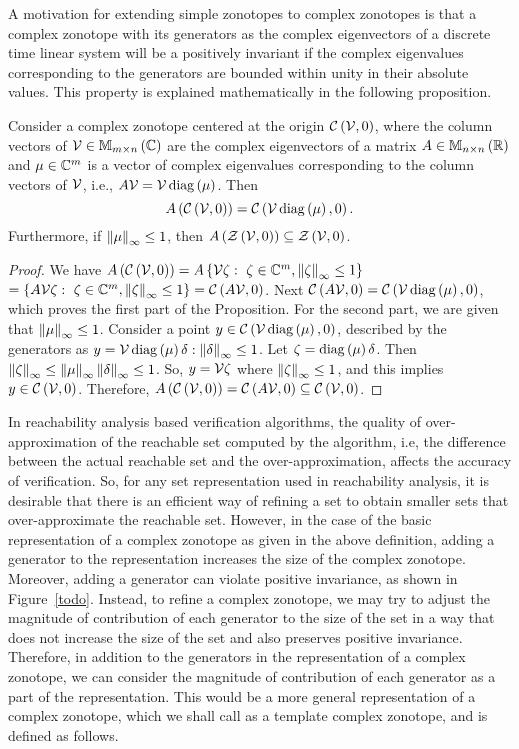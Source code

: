A motivation for extending simple zonotopes to complex zonotopes is
that a complex zonotope with its generators as the complex
eigenvectors of a discrete time linear system will be a positively
invariant if the complex eigenvalues corresponding to the generators
are bounded within unity in their absolute values.  This property is
explained mathematically in the following proposition.
%
\begin{proposition}
Consider a complex zonotope centered at the origin
$\mathit{\mathcal{C}}\left(\mathcal{V},0\right)$, where the column vectors of
$\mathcal{V}\in\mathbb{M}_{m\times n}\left(\mathbb{C}\right)$ are the complex eigenvectors of a
matrix $A\in\mathbb{M}_{n\times n}\left(\mathbb{R}\right)$ and $\mu\in\mathbb{C}^m$ is a vector of complex
eigenvalues corresponding to the column vectors of $\mathcal{V}$, i.e., $A\mathcal{V}
= \mathcal{V}\operatorname{diag}\left(\mu\right)$.
Then \[A\left(\mathit{\mathcal{C}}\left(\mathcal{V},0\right)\right)
= \mathit{\mathcal{C}}\left(\mathcal{V}\operatorname{diag}\left(\mu\right),0\right).\] Furthermore, if $\left\|\mu\right\|_{\infty}\leq
1$, then $A\left(\mathit{\mathcal{Z}}\left(\mathcal{V},0\right)\right)\subseteq \mathit{\mathcal{Z}}\left(\mathcal{V},0\right)$.
\end{proposition}
% 
\begin{proof}
We have $A\left(\mathit{\mathcal{C}}\left(\mathcal{V},0\right)\right) =
A\left\{\mathcal{V}\zeta:~\zeta\in\mathbb{C}^m,\left\|\zeta\right\|_{\infty}\leq 1\right\}$\\
$=\left\{A\mathcal{V}\zeta:~\zeta\in\mathbb{C}^m,\left\|\zeta\right\|_{\infty}\leq 1\right\}
= \mathit{\mathcal{C}}\left(A\mathcal{V},0\right)$.  Next $\mathit{\mathcal{C}}\left(A\mathcal{V},0\right)
= \mathit{\mathcal{C}}\left(\mathcal{V}\operatorname{diag}\left(\mu\right),0\right)$, which proves the first part of the
Proposition.  For the second part, we are given that
$\left\|\mu\right\|_{\infty}\leq 1$.  Consider a point $y\in \mathit{\mathcal{C}}\left(\mathcal{V}\operatorname{diag}\left(\mu\right),0\right)$,
described by the generators as
$y = \mathcal{V}\operatorname{diag}\left(\mu\right)\delta:\left\|\delta\right\|_{\infty}\leq 1$.
Let $\zeta = \operatorname{diag}\left(\mu\right)\delta$. Then
$\left\|\zeta\right\|_{\infty} \leq \left\|\mu\right\|_{\infty}\left\|\delta\right\|_{\infty} \leq 1$.  So, 
$y=\mathcal{V}\zeta$ where $\left\|\zeta\right\|_{\infty}\leq 1$, and this implies $y\in \mathit{\mathcal{C}}\left(\mathcal{V},0\right)$.
Therefore, $A\left(\mathit{\mathcal{C}}\left(\mathcal{V},0\right)\right)=\mathit{\mathcal{C}}\left(A\mathcal{V},0\right)\subseteq \mathit{\mathcal{C}}\left(\mathcal{V},0\right)$.
\end{proof}
%
In reachability analysis based verification algorithms, the quality of
over-approximation of the reachable set computed by the algorithm, i.e,
the difference between the actual reachable set and the
over-approximation, affects the accuracy of verification.  So, for any
set representation used in reachability analysis, it is desirable that
there is an efficient way of refining a set to obtain smaller sets
that over-approximate the reachable set.  However, in the case of the
basic representation of a complex zonotope as given in the above
definition, adding a generator to the representation increases the
size of the complex zonotope.  Moreover, adding a generator can
violate positive invariance, as shown in Figure~\ref{todo}.  Instead,
to refine a complex zonotope, we may try to adjust the magnitude of
contribution of each generator to the size of the set in a way that
does not increase the size of the set and also preserves positive
invariance.  Therefore, in addition to the generators in the
representation of a complex zonotope, we can consider the magnitude of
contribution of each generator as a part of the representation.  This
would be a more general representation of a complex zonotope, which we
shall call as a template complex zonotope, and is defined as follows.

